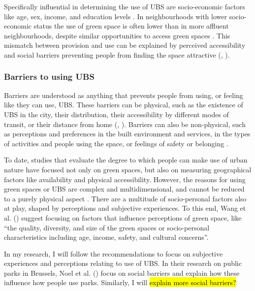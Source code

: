 \documentclass{article}
\begin{document}
Specifically influential in determining the use of UBS are socio-economic factors like age, sex, income, and education levels \parencite{phillips2021use}. In neighbourhoods with lower socio-economic status the use of green space is often lower than in more affluent neighbourhoods, despite similar opportunities to access green spaces \parencite{wang2015comparison}. This mismatch between provision and use can be explained by perceived accessibility and social barriers preventing people from finding the space attractive (\cite{wang2015physical}, \cite{noel2021social}).

\subsubsection{Barriers to using UBS}

Barriers are understood as anything that prevents people from using, or feeling like they can use, UBS.
These barriers can be physical, such as the existence of UBS in the city, their distribution, their accessibility by different modes of transit, or their distance from home (\cite{REF}, \cite{REF}). Barriers can also be non-physical, such as perceptions and preferences in the built environment and services, in the types of activities and people using the space, or feelings of safety or belonging \parencite{REF}.

To date, studies that evaluate the degree to which people can make use of urban nature have focused not only on green spaces, but also on measuring geographical factors like availability and physical accessibility.
However, the reasons for using green spaces or UBS are complex and multidimensional, and cannot be reduced to a purely physical aspect \parencite{wang2015physical}. There are a multitude of socio-personal factors also at play, shaped by perceptions and subjective experiences. To this end, Wang et al. (\citeyear{wang2015physical}) suggest focusing on factors that influence perceptions of green space, like ``the quality, diversity, and size of the green spaces or socio-personal characteristics including age, income, safety, and cultural concerns''.

In my research, I will follow the recommendations to focus on subjective experiences and perceptions relating to use of UBS. In their research on public parks in Brussels, Noel et al. (\citeyear{noel2021social}) focus on social barriers and explain how these influence how people use parks. Similarly, I will 
\hl{explain more social barriers?} 
\end{document}

